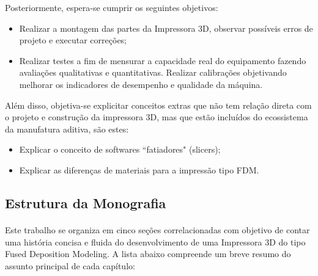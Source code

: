 \documentclass[12pt, english]{article}
\begin{document}
Posteriormente, espera-se cumprir os seguintes objetivos:

\begin{itemize}
\item Realizar a montagem das partes da Impressora 3D, observar possíveis erros de projeto e executar correções;
\item Realizar testes a fim de mensurar a capacidade real do equipamento fazendo avaliações qualitativas e quantitativas. Realizar calibrações objetivando melhorar os indicadores de desempenho e qualidade da máquina.
\end{itemize}

Além disso, objetiva-se explicitar conceitos extras que não tem relação direta com o projeto e construção da impressora 3D, mas que estão incluídos do ecossistema da manufatura aditiva, são estes:

\begin{itemize}
\item Explicar o conceito de softwares “fatiadores" (slicers);
\item Explicar as diferenças de materiais para a impressão tipo FDM.
\end{itemize}

\subsection{Estrutura da Monografia}

\paragraph{}
Este trabalho se organiza em cinco seções correlacionadas com objetivo de contar uma história concisa e fluida do desenvolvimento de uma Impressora 3D do tipo Fused Deposition Modeling. A lista abaixo compreende um breve resumo do assunto principal de cada capítulo:
\end{document}
